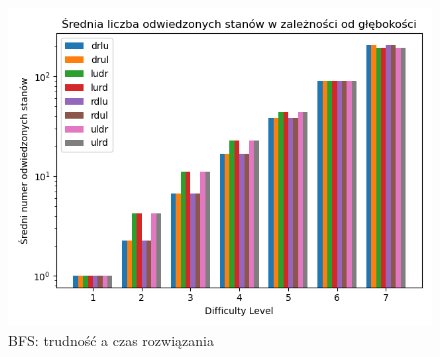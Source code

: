 \documentclass{classrep}
\begin{document}
\begin{figure}[p] \centering
 \includegraphics[width=0.9\linewidth]{./pic/bfs_vstd_c_vs_diff.png}
 \caption{BFS: trudność a czas rozwiązania}
\end{figure}
\end{document}
